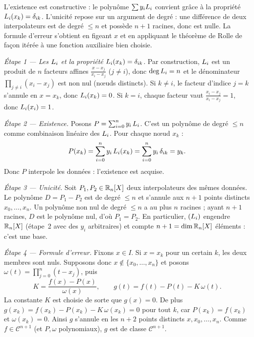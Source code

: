 \begin{ideepreuve}
L'existence est constructive : le polynôme $\sum y_i L_{i}$ convient
grâce à la propriété $L_{i}(x_k)=\delta_{ik}$. L'unicité repose sur un
argument de degré : une différence de deux interpolateurs est de degré
$\leq n$ et possède $n+1$ racines, donc est nulle. La formule d'erreur
s'obtient en figeant $x$ et en appliquant le théorème de Rolle de façon
itérée à une fonction auxiliaire bien choisie.
\end{ideepreuve}

\vspace{10pt}

\begin{mdframed}[style=proofbar]
  \textit{Étape 1 — Les $L_{i}$ et la propriété
  $L_{i}(x_k)=\delta_{ik}$.}
  Par construction, $L_{i}$ est un produit de $n$ facteurs affines
  $\tfrac{x-x_j}{x_i-x_j}$ ($j \neq i$), donc $\deg L_{i} = n$ et le
  dénominateur $\prod_{j\neq i}(x_i-x_j)$ est non nul (nœuds distincts).
  Si $k \neq i$, le facteur d'indice $j=k$ s'annule en $x=x_k$, donc
  $L_{i}(x_k)=0$. Si $k=i$, chaque facteur vaut
  $\tfrac{x_i-x_j}{x_i-x_j}=1$, donc $L_{i}(x_i)=1$.

  \medskip
  \textit{Étape 2 — Existence.}
  Posons $P = \sum_{i=0}^{n} y_i\,L_{i}$. C'est un polynôme de degré
  $\leq n$ comme combinaison linéaire des $L_{i}$. Pour chaque nœud
  $x_k$ :
  \[
    P(x_k) = \sum_{i=0}^{n} y_i\,L_{i}(x_k)
           = \sum_{i=0}^{n} y_i\,\delta_{ik} = y_k.
  \]
  Donc $P$ interpole les données : l'existence est acquise.

  \medskip
  \textit{Étape 3 — Unicité.}
  Soit $P_1, P_2 \in \mathbb{R}_n[X]$ deux interpolateurs des mêmes données. Le
  polynôme $D = P_1 - P_2$ est de degré $\leq n$ et s'annule aux $n+1$
  points distincts $x_0, \ldots, x_n$. Un polynôme non nul de degré
  $\leq n$ a au plus $n$ racines ; ayant $n+1$ racines, $D$ est le
  polynôme nul, d'où $P_1 = P_2$. En particulier, $(L_{i})$ engendre
  $\mathbb{R}_n[X]$ (étape~2 avec des $y_i$ arbitraires) et compte $n+1 = \dim \mathbb{R}_n[X]$
  éléments : c'est une base.

  \medskip
  \textit{Étape 4 — Formule d'erreur.}
  Fixons $x \in I$. Si $x = x_k$ pour un certain $k$, les deux membres
  sont nuls. Supposons donc $x \notin \{x_0,\ldots,x_n\}$ et posons
  $\omega(t) = \prod_{j=0}^{n}(t-x_j)$, puis
  \[
    K = \frac{f(x) - P(x)}{\omega(x)}, \qquad
    g(t) = f(t) - P(t) - K\,\omega(t).
  \]
  La constante $K$ est choisie de sorte que $g(x)=0$. De plus
  $g(x_k) = f(x_k) - P(x_k) - K\,\omega(x_k) = 0$ pour tout $k$, car
  $P(x_k)=f(x_k)$ et $\omega(x_k)=0$. Ainsi $g$ s'annule en les $n+2$
  points distincts $x, x_0, \ldots, x_n$. Comme $f \in \mathcal{C}^{n+1}$
  (et $P,\omega$ polynomiaux), $g$ est de classe $\mathcal{C}^{n+1}$.


\end{mdframed}
